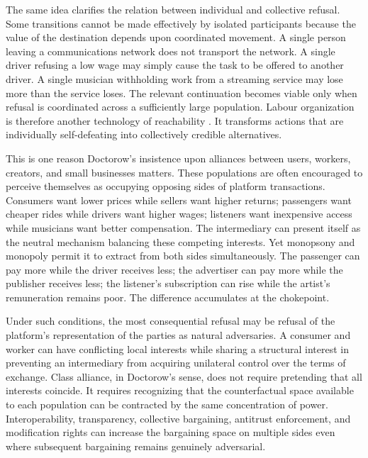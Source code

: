 \documentclass[11pt]{article}
\begin{document}
The same idea clarifies the relation between individual and collective refusal. Some transitions cannot be made effectively by isolated participants because the value of the destination depends upon coordinated movement. A single person leaving a communications network does not transport the network. A single driver refusing a low wage may simply cause the task to be offered to another driver. A single musician withholding work from a streaming service may lose more than the service loses. The relevant continuation becomes viable only when refusal is coordinated across a sufficiently large population. Labour organization is therefore another technology of reachability \parencite{olson1965collective,schelling1978micromotives}. It transforms actions that are individually self-defeating into collectively credible alternatives.

This is one reason Doctorow's insistence upon alliances between users, workers, creators, and small businesses matters. These populations are often encouraged to perceive themselves as occupying opposing sides of platform transactions. Consumers want lower prices while sellers want higher returns; passengers want cheaper rides while drivers want higher wages; listeners want inexpensive access while musicians want better compensation. The intermediary can present itself as the neutral mechanism balancing these competing interests. Yet monopsony and monopoly permit it to extract from both sides simultaneously. The passenger can pay more while the driver receives less; the advertiser can pay more while the publisher receives less; the listener's subscription can rise while the artist's remuneration remains poor. The difference accumulates at the chokepoint.

Under such conditions, the most consequential refusal may be refusal of the platform's representation of the parties as natural adversaries. A consumer and worker can have conflicting local interests while sharing a structural interest in preventing an intermediary from acquiring unilateral control over the terms of exchange. Class alliance, in Doctorow's sense, does not require pretending that all interests coincide. It requires recognizing that the counterfactual space available to each population can be contracted by the same concentration of power. Interoperability, transparency, collective bargaining, antitrust enforcement, and modification rights can increase the bargaining space on multiple sides even where subsequent bargaining remains genuinely adversarial.
\end{document}
